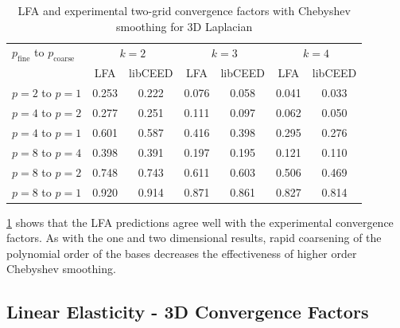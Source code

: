 \documentclass[review]{siamart190516}
\begin{document}
\begin{table}[ht!]
\begin{center}
\begin{tabular}{l cc cc cc}
  \toprule
  $p_{\text{fine}}$ to $p_{\text{coarse}}$  &  \multicolumn{2}{c}{$k = 2$}  &  \multicolumn{2}{c}{$k = 3$}  &  \multicolumn{2}{c}{$k = 4$}  \\
                      &  LFA  &  libCEED  &  LFA  &  libCEED  &  LFA  &  libCEED  \\
  \toprule
  $p = 2$ to $p = 1$  &  0.253 & 0.222  &  0.076 & 0.058  &  0.041 & 0.033  \\
  \midrule
  $p = 4$ to $p = 2$  &  0.277 & 0.251  &  0.111 & 0.097  &  0.062 & 0.050  \\
  $p = 4$ to $p = 1$  &  0.601 & 0.587  &  0.416 & 0.398  &  0.295 & 0.276  \\
  \midrule
  $p = 8$ to $p = 4$  &  0.398 & 0.391  &  0.197 & 0.195  &  0.121 & 0.110  \\
  $p = 8$ to $p = 2$  &  0.748 & 0.743  &  0.611 & 0.603  &  0.506 & 0.469  \\
  $p = 8$ to $p = 1$  &  0.920 & 0.914  &  0.871 & 0.861  &  0.827 & 0.814  \\
  \bottomrule
\end{tabular}
\end{center}
\caption{LFA and experimental two-grid convergence factors with Chebyshev smoothing for 3D Laplacian}
\label{table:two_grid_3d_chebyshev}
\end{table}

\cref{table:two_grid_3d_chebyshev} shows that the LFA predictions agree well with the experimental convergence factors.
As with the one and two dimensional results, rapid coarsening of the polynomial order of the bases decreases the effectiveness of higher order Chebyshev smoothing.

\subsection{Linear Elasticity - 3D Convergence Factors}\label{sec:solidsresults}
\end{document}
